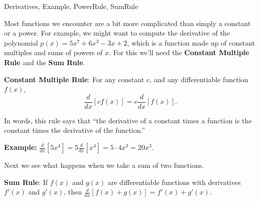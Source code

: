 \begin{tagblock}{Derivatives, Example, PowerRule, SumRule}
\begin{question}
	

\bigskip



Most functions we encounter are a bit more complicated than simply a constant or a power.  For example, we might want to compute the derivative of the polynomial $p(x) = 5x^7 + 6x^3 -3x +2$, which is a function made up of constant multiples and sums of powers of $x$.  For this we'll need the \textbf{Constant Multiple Rule} and the \textbf{Sum Rule}.


\begin{center}\textbf{Constant Multiple Rule}: For any constant $c$, and any differentiable function $f(x)$, $$\frac{d}{dx}[cf(x)] = c \frac{d}{dx}[f(x)].$$\end{center}

In words, this rule says that ``the derivative of a constant times a function is the constant times the derivative of the function.''

\textbf{Example:} $\frac{d}{dx} [5x^4] = 5 \frac{d}{dx}[x^4] = 5 \cdot 4 x^3 = 20 x^3$.  

\newpage
Next we see what happens when we take a sum of two functions. %

\begin{center}\textbf{Sum Rule}: If $f(x)$ and $g(x)$ are differentiable functions with derivatives $f'(x)$ and $g'(x)$, then $\frac{d}{dx}[f(x)+g(x)] =f'(x)+g'(x)$. \end{center}


\end{question}
\end{tagblock}
